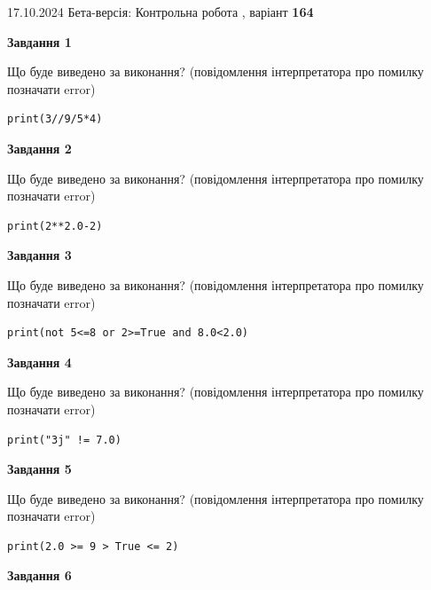 \documentclass[12pt, ukrainian]{article}
\begin{document}
{\Large{17.10.2024 Бета-версія: Контрольна робота , варіант  \No \textbf { 164 }\par}}
{
\begin {large}
{\begin {center}\textbf{Завдання 1}\end {center}}

Що буде виведено за виконання? (повідомлення інтерпретатора про помилку позначати error)\par
\begin{verbatim}
print(3//9/5*4)
\end{verbatim}

{\begin {center}\textbf{Завдання 2}\end {center}}

Що буде виведено за виконання? (повідомлення інтерпретатора про помилку позначати error)\par
\begin{verbatim}
print(2**2.0-2)
\end{verbatim}

{\begin {center}\textbf{Завдання 3}\end {center}}

Що буде виведено за виконання? (повідомлення інтерпретатора про помилку позначати error)\par
\begin{verbatim}
print(not 5<=8 or 2>=True and 8.0<2.0)
\end{verbatim}

{\begin {center}\textbf{Завдання 4}\end {center}}

Що буде виведено за виконання? (повідомлення інтерпретатора про помилку позначати error)\par
\begin{verbatim}
print("3j" != 7.0)
\end{verbatim}

{\begin {center}\textbf{Завдання 5}\end {center}}

Що буде виведено за виконання? (повідомлення інтерпретатора про помилку позначати error)\par
\begin{verbatim}
print(2.0 >= 9 > True <= 2)
\end{verbatim}

{\begin {center}\textbf{Завдання 6}\end {center}}


\end{large}}
\end{document}
